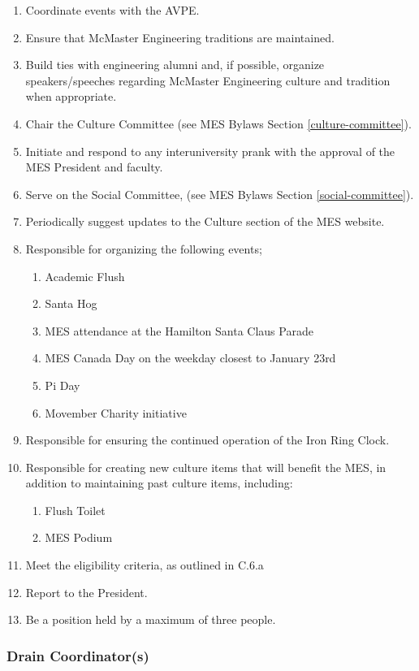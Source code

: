 \begin{enumerate}
 \item
  Coordinate events with the AVPE.
 \item
  Ensure that McMaster Engineering traditions are maintained.
 \item
  Build ties with engineering alumni and, if possible, organize
  speakers/speeches regarding McMaster Engineering culture and tradition
  when appropriate.
 \item
  Chair the Culture Committee (see MES Bylaws Section \ref{culture-committee}).
 \item
  Initiate and respond to any interuniversity prank with the approval of
  the MES President and faculty.
 \item
  Serve on the Social Committee, (see MES Bylaws Section \ref{social-committee}).
 \item
  Periodically suggest updates to the Culture section of the MES
  website.
 \item
  Responsible for organizing the following events;

  \begin{enumerate}
   \item
    Academic Flush
   \item
    Santa Hog
   \item
    MES attendance at the Hamilton Santa Claus Parade
   \item
    MES Canada Day on the weekday closest to January 23rd
   \item
    Pi Day
   \item
    Movember Charity initiative
  \end{enumerate}
 \item
  Responsible for ensuring the continued operation of the Iron Ring
  Clock.
 \item
  Responsible for creating new culture items that will benefit the MES,
  in addition to maintaining past culture items, including:

  \begin{enumerate}
   \item
    Flush Toilet
   \item
    MES Podium
  \end{enumerate}
 \item
  Meet the eligibility criteria, as outlined in C.6.a %
 \item
  Report to the President.
 \item
  Be a position held by a maximum of three people.

\end{enumerate}
\hypertarget{drain-coordinators}{%
 \subsubsection{Drain Coordinator(s)}
 \label{drain-coordinators}}

